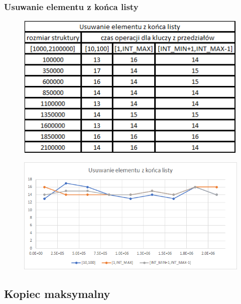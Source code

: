 \documentclass{article}
\begin{document}
\newpage

\subsubsection*{Usuwanie elementu z końca listy}

\begin{figure}[h!]

\includegraphics{images/list_usuwanie_koniec.png}

\end{figure}

\begin{figure}[h!]
\includegraphics[width=11.3cm]{images/list_usu_koniec_w.png}
\end{figure}

\newpage

\subsection{Kopiec maksymalny}
\end{document}
